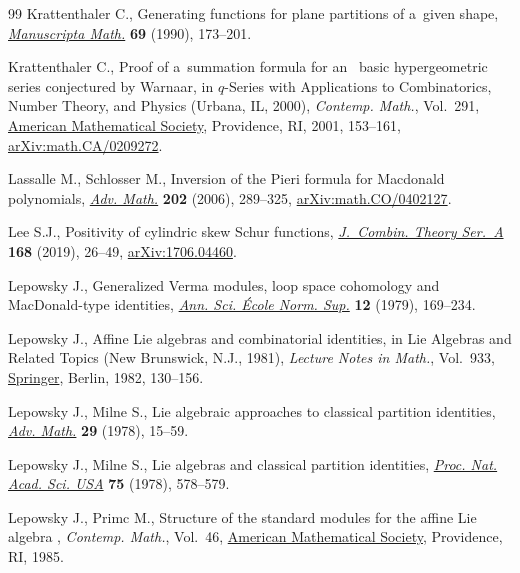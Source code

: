 \documentclass[pdftex]{sigma}
\numberwithin{equation}{section}
\begin{document}
\begin{thebibliography}{99}
Krattenthaler C., Generating functions for plane partitions of a~given shape,
 \href{https://doi.org/10.1007/BF02567918}{\textit{Manuscripta Math.}}
 \textbf{69} (1990), 173--201.

Krattenthaler C., Proof of a~summation formula for an~ basic
 hypergeometric series conjectured by {W}arnaar, in {$q$}-{S}eries with
 Applications to Combinatorics, Number Theory, and Physics ({U}rbana, {IL},
 2000), \textit{Contemp. Math.}, Vol.~291,
 \href{https://doi.org/10.1090/conm/291/04899}{American Mathematical Society},
 Providence, RI, 2001, 153--161,
 \href{http://arxiv.org/abs/math.CA/0209272}{arXiv:math.CA/0209272}.

Lassalle M., Schlosser M., Inversion of the {P}ieri formula for {M}acdonald
 polynomials, \href{https://doi.org/10.1016/j.aim.2005.03.009}{\textit{Adv.
 Math.}} \textbf{202} (2006), 289--325,
 \href{http://arxiv.org/abs/math.CO/0402127}{arXiv:math.CO/0402127}.

Lee S.J., Positivity of cylindric skew {S}chur functions,
 \href{https://doi.org/10.1016/j.jcta.2019.05.009}{\textit{J.~Combin. Theory
 Ser.~A}} \textbf{168} (2019), 26--49,
 \href{http://arxiv.org/abs/1706.04460}{arXiv:1706.04460}.

Lepowsky J., Generalized {V}erma modules, loop space cohomology and
 {M}ac{D}onald-type identities,
 \href{https://doi.org/10.24033/asens.1365}{\textit{Ann. Sci. \'Ecole Norm.
 Sup.}} \textbf{12} (1979), 169--234.

Lepowsky J., Affine {L}ie algebras and combinatorial identities, in Lie
 Algebras and Related Topics ({N}ew {B}runswick, {N}.{J}., 1981),
 \textit{Lecture Notes in Math.}, Vol.~933, \href{https://doi.org/10.1007/BFb0093358}{Springer}, Berlin, 1982, 130--156.

Lepowsky J., Milne S., Lie algebraic approaches to classical partition
 identities, \href{https://doi.org/10.1016/0001-8708(78)90004-X}{\textit{Adv.
 Math.}} \textbf{29} (1978), 15--59.

Lepowsky J., Milne S., Lie algebras and classical partition identities,
 \href{https://doi.org/10.1073/pnas.75.2.578}{\textit{Proc. Nat. Acad. Sci.
 USA}} \textbf{75} (1978), 578--579.

Lepowsky J., Primc M., Structure of the standard modules for the affine {L}ie
 algebra , \textit{Contemp. Math.}, Vol.~46,
 \href{https://doi.org/10.1090/conm/046}{American Mathematical Society},
 Providence, RI, 1985.


\end{thebibliography}
\end{document}
